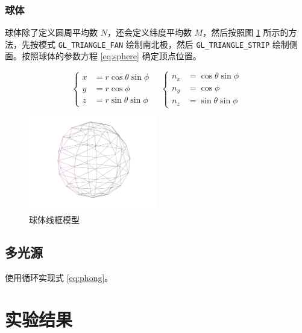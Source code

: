 \documentclass[math-font=newcm]{sjtuarticle}
\providecommand{\codeRange}[4]{}
\begin{document}
\subsubsection{球体}

球体除了定义圆周平均数 $N$，还会定义纬度平均数 $M$，然后按照图 \ref{fig:sphere} 所示的方法，先按模式 \verb"GL_TRIANGLE_FAN" 绘制南北极，然后 \verb"GL_TRIANGLE_STRIP" 绘制侧面。按照球体的参数方程 \eqref{eq:sphere} 确定顶点位置。

\begin{equation}\label{eq:sphere}
    \begin{cases}
        x&=r\cos\theta\sin\phi\\
        y&=r\cos\phi\\
        z&=r\sin\theta\sin\phi
    \end{cases}\quad
    \begin{cases}
        n_x&=\cos\theta\sin\phi\\
        n_y&=\cos\phi\\
        n_z&=\sin\theta\sin\phi
    \end{cases}
\end{equation}

\begin{figure}[h]
    \centering
    \includegraphics[width=0.5\textwidth]{sphere.png}
    \caption{球体线框模型}
    \label{fig:sphere}
\end{figure}

\subsection{多光源}

使用循环实现式 \eqref{eq:phong}。

\codeRange{../source/assets/shader/fragmentShader.glsl}{c}{55}{63}

\section{实验结果}
\end{document}

